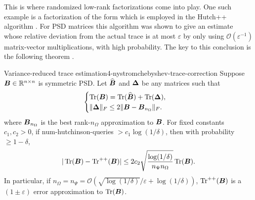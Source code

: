This is where randomized low-rank factorizations come into play.
One such example is a factorization of the form 
which is employed in the Hutch++ algorithm \cite[algorithm~1]{meyer2021hutch}.
For \gls{PSD} matrices this algorithm was shown to give
an estimate whose relative deviation from the actual trace is at most
$\varepsilon$ by only using $\mathcal{O}(\varepsilon^{-1})$ matrix-vector multiplications,
with high probability. The key to this conclusion is the following theorem \cite[theorem~1]{meyer2021hutch}.
\begin{theorem}{Variance-reduced trace estimation}{4-nystromchebyshev-trace-correction}
    Suppose $\boldsymbol{B} \in \mathbb{R}^{n \times n}$ is symmetric \gls{PSD}. Let $\widehat{\boldsymbol{B}}$ and
    $\boldsymbol{\Delta}$ be any matrices such that
    \begin{equation}
        \begin{cases}
            \operatorname{Tr}(\boldsymbol{B}) = \operatorname{Tr}(\widehat{\boldsymbol{B}}) + \operatorname{Tr}(\boldsymbol{\Delta}), \\
            \lVert \boldsymbol{\Delta} \rVert _F \leq 2 \lVert \boldsymbol{B} - \boldsymbol{B}_{n_{\Omega}} \rVert _F.
        \end{cases}
    \end{equation}
    where $\boldsymbol{B}_{n_{\Omega}}$ is the best rank-$n_{\Omega}$ approximation to $\boldsymbol{B}$.
    For fixed constants $c_1, c_2 > 0$, if \gls{num-hutchinson-queries} $> c_1\log(1/\delta)$, then with probability $\geq 1 - \delta$,
    \begin{equation}
        |\operatorname{Tr}(\boldsymbol{B}) - \operatorname{Tr}^{++}(\boldsymbol{B})| \leq 2 c_2 \sqrt{\frac{\log(1/\delta)}{n_{\Psi} n_{\Omega}}} \operatorname{Tr}(\boldsymbol{B}).
    \end{equation}
    In particular, if $n_{\Omega}=n_{\Psi}=\mathcal{O}\left( \sqrt{\log(1/\delta)}/ \varepsilon + \log(1/\delta) \right)$, $\operatorname{Tr}^{++}(\boldsymbol{B})$ is a $(1 \pm \varepsilon)$ error approximation to $\operatorname{Tr}(\boldsymbol{B})$.
\end{theorem}

